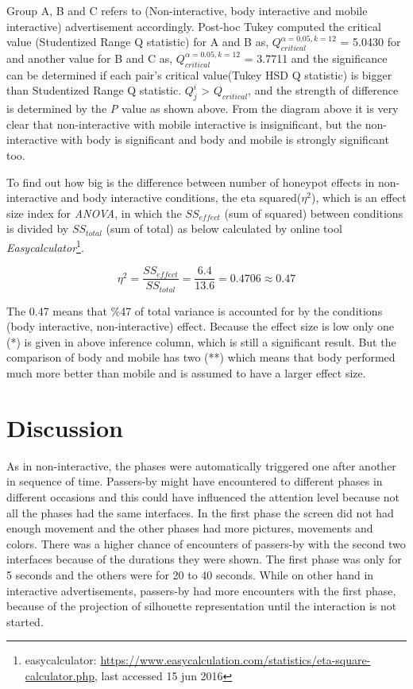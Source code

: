 Group A, B and C refers to (Non-interactive, body interactive and mobile interactive) advertisement accordingly. Post-hoc Tukey computed the critical value (Studentized Range Q statistic) for A and B as, ${Q}_{critical}^{\alpha=0.05,k=12}$ = 5.0430 for and another  value for B and C as, ${Q}_{critical}^{\alpha=0.05,k=12}$ = 3.7711 and the significance can be determined if each pair’s critical value(Tukey HSD Q statistic) is bigger than Studentized Range Q statistic. ${Q}_{j}^{i }$ > ${Q}_{critical}$, and the strength of difference is determined by the \emph{P} value as shown above. From the diagram above it is very clear that non-interactive with mobile interactive is insignificant, but the non-interactive with body is significant and body and mobile is strongly significant too.

To find out how big is the difference between number of honeypot effects in non-interactive and body interactive conditions, the eta squared(${\eta}^2$), which is an effect size index for \emph{ANOVA}, in which the $SS_{effect}$ (sum of squared) between conditions is divided by $SS_{total}$  (sum of total) as below calculated by online tool \emph{Easycalculator}\footnote{easycalculator: \url{https://www.easycalculation.com/statistics/eta-square-calculator.php}, last accessed 15 jun 2016}.

\[
{\eta}^2 = \frac{{SS}_{effect}}{{SS}_{total}} = \frac{6.4}{13.6} = 0.4706 \approx 0.47
\]

The 0.47 means that \%47 of total variance is accounted for by the conditions (body interactive, non-interactive) effect. Because the effect size is low only one (*) is given in above inference column, which is still a significant result. But the comparison of body and mobile has two (**) which means that body performed much more better than mobile and is assumed to have a larger effect size.


\section{Discussion}

As in non-interactive, the phases were automatically triggered one after another in sequence of time. Passers-by might have encountered to different phases in different occasions and this could have influenced the attention level because not all the phases had the same interfaces. In the first phase the screen did not had enough movement and the other phases had more pictures, movements and colors. There was a higher chance of encounters of passers-by with the second two interfaces because of the durations they were shown. The first phase was only for 5 seconds and the others were for 20 to 40 seconds. While on other hand in interactive advertisements, passers-by had more encounters with the first phase, because of the projection of silhouette representation until the interaction is not started. 

